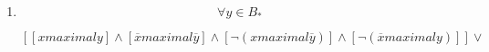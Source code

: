 \begin{enumerate}
\begin{enumerate}
\begin{enumerate}
\begin{enumerate}
        \begin{enumerate}
        \def\labelenumv{\arabic{enumv}.}
        \item
          \[\exists{x \in B}x\mathsf{\mathit{maximal}}y\]
        \item
          \[{x \in \mathit{Htom}}{{{(B)} \land y} \notin \mathit{Htom}}{(B)}\Rightarrow{x \neq y}\]

          \begin{enumerate}
          \def\labelenumvi{\arabic{enumvi}.}
          \item
            Supongamos \[\overline{x}\mathsf{\mathit{maximal}}y\]

            \begin{enumerate}
            \def\labelenumvii{\arabic{enumvii}.}
            \tightlist
            \item
              \[{\overline{x} + y} = \overline{x}\]
            \item
              \[{{y = {{({\overline{x} + y})} \cdot {({x + y})}}} = {\overline{x} \cdot x}} = 0\]
            \end{enumerate}
          \item
            Supongamos\[y \neq 0\]

            \begin{enumerate}
            \def\labelenumvii{\arabic{enumvii}.}
            \tightlist
            \item
              \[\neg{({\overline{x}{\mathsf{\mathit{maximal}}y}})}\]
            \item
              \[{\overline{x} + y} = 1\]
            \item
              \[{x \cdot \overline{y}} = 0\]
            \item
              \[\overline{x}\mathsf{\mathit{maximal}}\overline{y}\]
            \end{enumerate}
          \end{enumerate}
        \end{enumerate}
      \item
        \[\forall{y \in B_{\ast}}\]

        \[\left\lbrack {{{\left\lbrack {x\mathsf{\mathit{maximal}}y} \right\rbrack \land \left\lbrack {\overline{x}\mathsf{\mathit{maximal}}\overline{y}} \right\rbrack} \land \left\lbrack {\neg{({x\mathsf{\mathit{maximal}}\overline{y}})}} \right\rbrack} \land \left\lbrack {\neg{({\overline{x}\mathsf{\mathit{maximal}}y})}} \right\rbrack} \right\rbrack \vee\]


\end{enumerate}
\end{enumerate}
\end{enumerate}
\end{enumerate}
